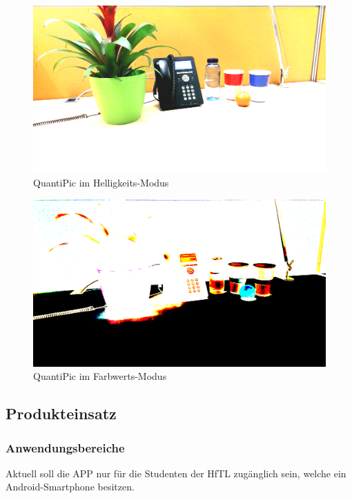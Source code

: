 \begin{landscape}
\begin{figure}[h]
	\centering
		\includegraphics[width=1.4\textwidth]{img/Fotos/QuantiPic_Helligkeit.png}
	\caption[QuantiPic Helligkeit]{QuantiPic im Helligkeits-Modus}
	\label{fig:quanti_hell}
\end{figure}

\begin{figure}[h]
	\centering
		\includegraphics[width=1.4\textwidth]{img/Fotos/QuantiPic_Farbwerte.png}
	\caption[QuantiPic Farbwerte]{QuantiPic im Farbwerts-Modus}
	\label{fig:quanti_farb}
\end{figure}





\end{landscape} 

\subsection{\textbf{Produkteinsatz}}

\subsubsection{Anwendungsbereiche}
Aktuell soll die APP nur für die Studenten der \acs{HfTL} zugänglich sein, welche ein Android-Smartphone besitzen. 

